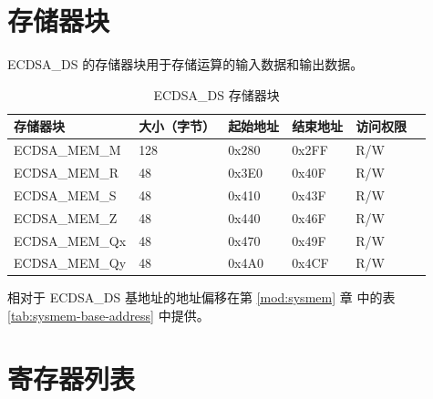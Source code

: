 \documentclass[main\_\_CN.tex]{subfiles}
\begin{document}
\newpage
\section{存储器块}

ECDSA\_DS 的存储器块用于存储运算的输入数据和输出数据。

\begin{table}[H]
    \centering
    \caption{ECDSA\_DS 存储器块} \label{tab:ecdsa-memory}
    \begin{threeparttable}
    \begin{tabular}{ | l | l | l | l | l | l | }
    \hline
        \rowcolor{lightgray}
        \textbf{存储器块} & \textbf{大小（字节）}  &  \textbf{起始地址}\tnote{*} &  \textbf{结束地址} \tnote{*} & \textbf{访问权限}   \\ \hline
        ECDSA\_MEM\_M    & 128  & 0x280 & 0x2FF & R/W \\ \hline
        ECDSA\_MEM\_R    & 48   & 0x3E0 & 0x40F & R/W \\ \hline
        ECDSA\_MEM\_S    & 48   & 0x410 & 0x43F & R/W \\ \hline
        ECDSA\_MEM\_Z    & 48   & 0x440 & 0x46F & R/W \\ \hline
        ECDSA\_MEM\_Qx   & 48   & 0x470 & 0x49F & R/W \\ \hline
        ECDSA\_MEM\_Qy   & 48   & 0x4A0 & 0x4CF & R/W \\ \hline
    \end{tabular}
    \begin{tablenotes}
        \item[*] 相对于 ECDSA\_DS 基地址的地址偏移在第 \ref{mod:sysmem} 章\textit{} 中的表 \ref{tab:sysmem-base-address} 中提供。
    \end{tablenotes}
    \end{threeparttable}
\end{table}





\newpage
\hypertarget{ecdsa-reg-summ}{}
\section{寄存器列表}
\label{sec:ecdsa-reg-summ}
\end{document}
